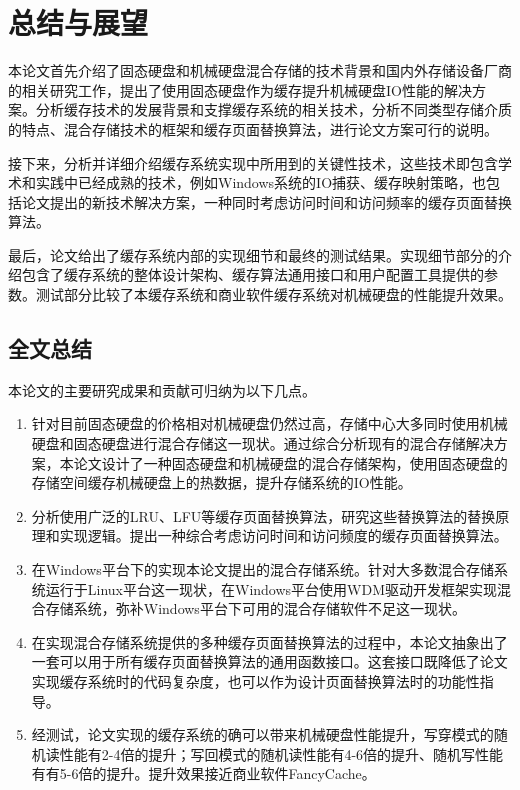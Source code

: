 \chapter{总结与展望}
\label{cha:conclusions}

本论文首先介绍了固态硬盘和机械硬盘混合存储的技术背景和国内外存储设备厂商的相关研究工作，提出了使用固态硬盘作为缓存提升机械硬盘IO性能的解决方案。分析缓存技术的发展背景和支撑缓存系统的相关技术，分析不同类型存储介质的特点、混合存储技术的框架和缓存页面替换算法，进行论文方案可行的说明。

接下来，分析并详细介绍缓存系统实现中所用到的关键性技术，这些技术即包含学术和实践中已经成熟的技术，例如Windows系统的IO捕获、缓存映射策略，也包括论文提出的新技术解决方案，一种同时考虑访问时间和访问频率的缓存页面替换算法。

最后，论文给出了缓存系统内部的实现细节和最终的测试结果。实现细节部分的介绍包含了缓存系统的整体设计架构、缓存算法通用接口和用户配置工具提供的参数。测试部分比较了本缓存系统和商业软件缓存系统对机械硬盘的性能提升效果。

\section{全文总结}
\label{sec:thesis_conclusion}
本论文的主要研究成果和贡献可归纳为以下几点。
\begin{enumerate}
\item
针对目前固态硬盘的价格相对机械硬盘仍然过高，存储中心大多同时使用机械硬盘和固态硬盘进行混合存储这一现状。通过综合分析现有的混合存储解决方案，本论文设计了一种固态硬盘和机械硬盘的混合存储架构，使用固态硬盘的存储空间缓存机械硬盘上的热数据，提升存储系统的IO性能。
\item
分析使用广泛的LRU、LFU等缓存页面替换算法，研究这些替换算法的替换原理和实现逻辑。提出一种综合考虑访问时间和访问频度的缓存页面替换算法。
\item
在Windows平台下的实现本论文提出的混合存储系统。针对大多数混合存储系统运行于Linux平台这一现状，在Windows平台使用WDM驱动开发框架实现混合存储系统，弥补Windows平台下可用的混合存储软件不足这一现状。
\item
在实现混合存储系统提供的多种缓存页面替换算法的过程中，本论文抽象出了一套可以用于所有缓存页面替换算法的通用函数接口。这套接口既降低了论文实现缓存系统时的代码复杂度，也可以作为设计页面替换算法时的功能性指导。
\item
经测试，论文实现的缓存系统的确可以带来机械硬盘性能提升，写穿模式的随机读性能有2-4倍的提升；写回模式的随机读性能有4-6倍的提升、随机写性能有有5-6倍的提升。提升效果接近商业软件FancyCache。
\end{enumerate}

